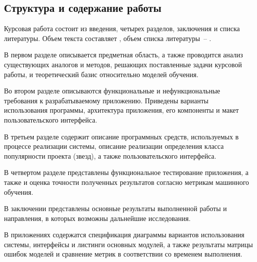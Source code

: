 \vspace{0.5em}
\subsection*{Структура и содержание работы}

Курсовая работа состоит из введения, четырех разделов, заключения и списка литературы. Объем текста составляет , объем списка литературы~-- .

В первом разделе описывается предметная область, а также проводится анализ существующих аналогов и методов, решающих поставленные задачи курсовой работы, и теоретический базис относительно моделей обучения.

Во втором разделе описываются функциональные и нефункциональные требования к разрабатываемому приложению. Приведены варианты использования программы, архитектура приложения, его компоненты и макет пользовательского интерфейса.

В третьем разделе содержит описание программных средств, используемых в процессе реализации системы, описание реализации определения класса популярности проекта (звезд), а также пользовательского интерфейса.

В четвертом разделе представлены функциональное тестирование приложения, а также и оценка точности полученных результатов согласно метрикам машинного обучения.

В заключении представлены основные результаты выполненной работы и направления, в которых возможны дальнейшие исследования.

В приложениях содержатся спецификация диаграммы вариантов использования системы, интерфейсы и листинги основных модулей, а также результаты матрицы ошибок моделей и сравнение метрик в соответствии со временем выполнения.
